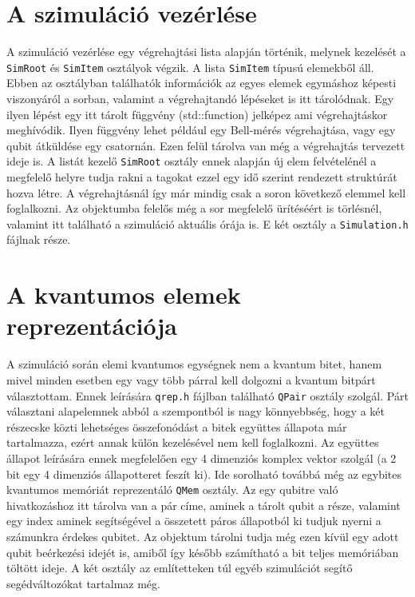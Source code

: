 \section{A szimuláció vezérlése}
A szimuláció vezérlése egy végrehajtási lista alapján történik, melynek kezelését a \texttt{SimRoot} és \texttt{SimItem} osztályok végzik. A lista \texttt{SimItem} típusú elemekből áll. Ebben az osztályban találhatók információk az egyes elemek egymáshoz képesti viszonyáról a sorban, valamint a végrehajtandó lépéseket is itt tárolódnak. Egy ilyen lépést egy itt tárolt függvény (std::function) jelképez ami végrehajtáskor meghívódik. Ilyen függvény lehet például egy Bell-mérés végrehajtása, vagy egy qubit átküldése egy csatornán. Ezen felül tárolva van még a végrehajtás tervezett ideje is. A listát kezelő \texttt{SimRoot} osztály ennek alapján új elem felvételénél a megfelelő helyre tudja rakni a tagokat ezzel egy idő szerint rendezett struktúrát hozva létre. A végrehajtásnál így már mindig csak a soron következő  elemmel kell foglalkozni.  Az objektumba felelős még a sor megfelelő ürítéséért is törlésnél, valamint itt található a szimuláció aktuális órája is.
E két osztály a \texttt{Simulation.h} fájlnak része.

\section{A kvantumos elemek reprezentációja}

A szimuláció során elemi kvantumos egységnek nem a kvantum bitet, hanem mivel minden esetben egy vagy több párral kell dolgozni a kvantum bitpárt választottam. Ennek leírására \texttt{qrep.h} fájlban található \texttt{QPair} osztály szolgál. Párt választani alapelemnek abból a szempontból is nagy könnyebbség, hogy a két részecske közti lehetséges összefonódást a bitek együttes állapota már tartalmazza, ezért annak külön kezelésével nem kell foglalkozni. Az együttes állapot leírására ennek megfelelően egy 4 dimenziós komplex vektor szolgál (a 2 bit egy 4 dimenziós állapotteret feszít ki).  Ide sorolható továbbá még az egybites kvantumos memóriát reprezentáló \texttt{QMem} osztály. Az egy qubitre való hivatkozáshoz itt tárolva van a pár címe, aminek a tárolt qubit a része, valamint egy index aminek segítségével a összetett páros állapotból ki tudjuk nyerni a számunkra érdekes qubitet. Az objektum tárolni tudja még ezen kívül egy adott qubit beérkezési idejét is, amiből így később számítható a bit teljes memóriában töltött ideje. A két osztály az említetteken túl egyéb szimulációt segítő segédváltozókat tartalmaz még.

